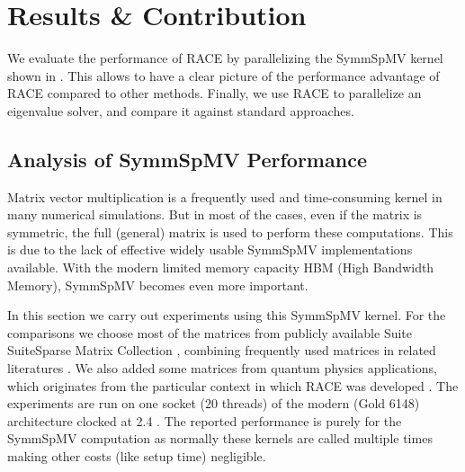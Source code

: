  
\section{Results \& Contribution} \label{sec:results}
We evaluate the performance of \acrshort{RACE} by parallelizing the \acrshort{SymmSpMV}
kernel shown in . This allows to have a clear picture of the
performance advantage of \acrshort{RACE} compared to other methods. Finally,
 we use \acrshort{RACE} to parallelize an eigenvalue solver, 
and compare it against standard approaches.

\subsection{Analysis of SymmSpMV Performance} \label{subsec:perf_symm_spmv}
Matrix vector multiplication is a frequently used and time-consuming kernel in
many numerical simulations. But in most of the cases, even if the matrix is symmetric,
the full (general) matrix is used to perform these computations.
This is due to the lack of effective widely usable \acrshort{SymmSpMV} implementations available.
With the modern limited memory capacity HBM (High Bandwidth Memory), \acrshort{SymmSpMV}
becomes even more important.

In this section we carry out experiments using this \acrshort{SymmSpMV} kernel.
For the comparisons we choose most of the matrices from publicly available Suite
SuiteSparse Matrix Collection \cite{UOF}, combining frequently 
used matrices in related literatures \cite{RSB,park_ls}. We also added
some matrices from quantum physics applications, which originates from 
the particular context in which \acrshort{RACE} was developed \cite{ESSEX}.
The experiments are
run on one socket ($20$ threads) of the modern \Intel \SKX (Gold 6148) architecture
clocked at 2.4 \GHZ. The reported performance is purely for the \acrshort{SymmSpMV}
computation as normally these kernels are called multiple times making other
costs (like setup time) negligible.

